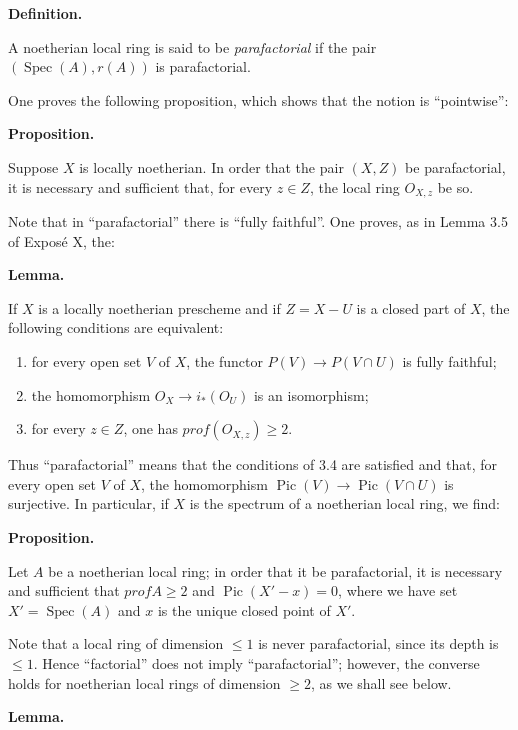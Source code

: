 \documentclass[
  11pt,
  a4paper,
]{book}
\providecommand{\tightlist}{%
  \setlength{\itemsep}{0pt}\setlength{\parskip}{0pt}}
\begin{document}
\textbf{Definition.}

A noetherian local ring is said to be \emph{parafactorial} if the pair
\((\operatorname{Spec}(A), {r(A)})\) is parafactorial.

One proves the following proposition, which shows that the notion is
``pointwise'':

\textbf{Proposition.}

Suppose \(X\) is locally noetherian. In order that the pair \((X, Z)\)
be parafactorial, it is necessary and sufficient that, for every
\(z \in Z\), the local ring \(O_{X,z}\) be so.

Note that in ``parafactorial'' there is ``fully faithful''. One proves,
as in Lemma 3.5 of Exposé X, the:

\textbf{Lemma.}

If \(X\) is a locally noetherian prescheme and if \(Z = X - U\) is a
closed part of \(X\), the following conditions are equivalent:

\begin{enumerate}
\def\labelenumi{\arabic{enumi}.}
\tightlist
\item
  for every open set \(V\) of \(X\), the functor
  \(P(V) \to P(V \cap U)\) is fully faithful;
\item
  the homomorphism \(O_{X} \to i_{*}(O_{U})\) is an isomorphism;
\item
  for every \(z \in Z\), one has \(prof(O_{X,z}) \geqslant 2\).
\end{enumerate}

Thus ``parafactorial'' means that the conditions of 3.4 are satisfied
and that, for every open set \(V\) of \(X\), the homomorphism
\(\operatorname{Pic}(V) \to \operatorname{Pic}(V \cap U)\) is
surjective. In particular, if \(X\) is the spectrum of a noetherian
local ring, we find:

\textbf{Proposition.}

Let \(A\) be a noetherian local ring; in order that it be parafactorial,
it is necessary and sufficient that \(prof A
\geqslant 2\) and \(\operatorname{Pic}(X' - {x}) = 0\), where we have
set \(X' = \operatorname{Spec}(A)\) and \(x\) is the unique closed point
of \(X'\).

Note that a local ring of dimension \(\leqslant 1\) is never
parafactorial, since its depth is \(\leqslant 1\). Hence ``factorial''
does not imply ``parafactorial''; however, the converse holds for
noetherian local rings of dimension \(\geqslant 2\), as we shall see
below.

\textbf{Lemma.}
\end{document}
